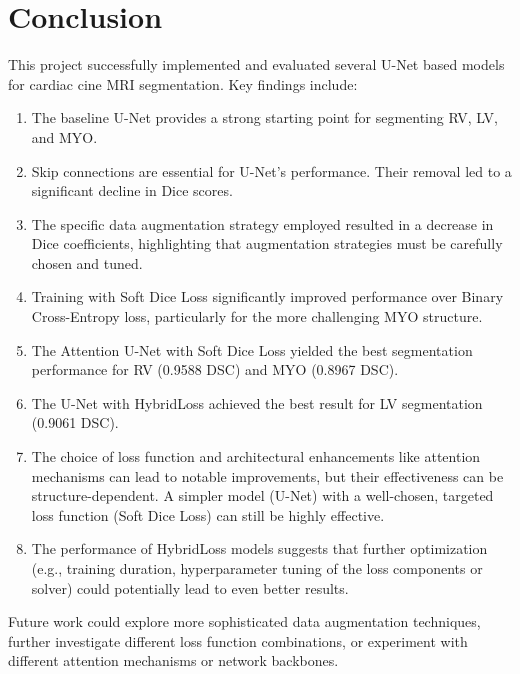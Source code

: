\documentclass{article}
\begin{document}
\section{Conclusion}
This project successfully implemented and evaluated several U-Net based models for cardiac cine MRI segmentation. Key findings include:
\begin{enumerate}
  \item The baseline U-Net provides a strong starting point for segmenting RV, LV, and MYO.
  \item Skip connections are essential for U-Net's performance. Their removal led to a significant decline in Dice scores.
  \item The specific data augmentation strategy employed resulted in a decrease in Dice coefficients, highlighting that augmentation strategies must be carefully chosen and tuned.
  \item Training with Soft Dice Loss significantly improved performance over Binary Cross-Entropy loss, particularly for the more challenging MYO structure.
  \item The Attention U-Net with Soft Dice Loss yielded the best segmentation performance for RV (0.9588 DSC) and MYO (0.8967 DSC).
  \item The U-Net with HybridLoss achieved the best result for LV segmentation (0.9061 DSC).
  \item The choice of loss function and architectural enhancements like attention mechanisms can lead to notable improvements, but their effectiveness can be structure-dependent. A simpler model (U-Net) with a well-chosen, targeted loss function (Soft Dice Loss) can still be highly effective.
  \item The performance of HybridLoss models suggests that further optimization (e.g., training duration, hyperparameter tuning of the loss components or solver) could potentially lead to even better results.
\end{enumerate}
Future work could explore more sophisticated data augmentation techniques, further investigate different loss function combinations, or experiment with different attention mechanisms or network backbones.
\end{document}
